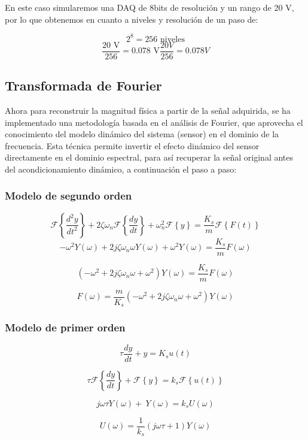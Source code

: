 \documentclass[conference]{IEEEtran}
\begin{document}
En este caso simularemos una DAQ de 8bits de resolución y un rango de 20 V, por lo que obtenemos en cuanto a niveles y resolución de un paso de:


\[
2^{8}=256 \text{ niveles}
\]
\[
\frac{20\text{ V}}{256}=0.078 \text{ V}
\frac{20V}{256}=0.078 V
\]



\subsection{Transformada de Fourier}

Ahora para reconstruir la magnitud física a partir de
la señal adquirida, se ha implementado una metodología basada en
el análisis de Fourier, que aprovecha el conocimiento del modelo dinámico 
del sistema (sensor) en el dominio de la frecuencia.
Esta técnica permite invertir el efecto dinámico del sensor directamente en el dominio espectral, para así recuperar la señal original antes del acondicionamiento dinámico, a continuación el paso a paso:

\subsubsection{Modelo de segundo orden}
\[
	\mathcal{F}\left\{ \frac{d^2y}{dt^2} \right\} + 2\zeta\omega_n \mathcal{F}\left\{\frac{dy}{dt}\right\} + \omega_n^2 \mathcal{F}\left\{y\right\} = \frac{K_s}{m} \mathcal{F}\left\{F(t)\right\}
\]
\[
	-\omega^2 Y(\omega)  + 2j\zeta\omega_n\omega Y(\omega) + \omega^2 Y(\omega) = \frac{K_s}{m}F(\omega)
\]
	
\[
	\left(-\omega^2  + 2j\zeta\omega_n\omega + \omega^2 \right) Y(\omega) = \frac{K_s}{m} F(\omega)
\]

\[
	F(\omega) = \frac{m}{K_s}  \left(-\omega^2  + 2j\zeta\omega_n\omega + \omega^2 \right) Y(\omega)
\]



\subsubsection{Modelo de primer orden}

\[
	\tau \frac{dy}{dt} + y = K_s u(t)
\]

\[
	\tau \mathcal{F}\left\{\frac{dy}{dt}\right\} + \mathcal{F} \left\{y\right\} = k_s \mathcal{F} \left\{u(t) \right\}
\]

\[
	 j\omega \tau  Y(\omega) + \ Y(\omega) = k_s U(\omega)
\]

\[
	U(\omega) = \frac{1}{k_s} (j\omega \tau + 1) Y(\omega)
\]
\end{document}
